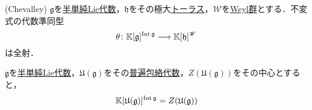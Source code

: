 \documentclass[rep_main]{subfiles}
\begin{document}
\begin{mytheo}[label=thm:Lie-poly-func-ring]{(Chevalley)}
	$\mathfrak{g}$を\hyperref[def:semisimple-LieAlg]{半単純Lie代数}，$\mathfrak{h}$をその極大\hyperref[def:toral-subLieAlg]{トーラス}，$\mathscr{W}$を\hyperref[def:Weylgroup]{Weyl群}とする．不変式の代数準同型
	\begin{equation}
		\theta\colon \mathbb{K}[\mathfrak{g}]^{\operatorname{Int}\mathfrak{g}} \longrightarrow \mathbb{K}[\mathfrak{h}]^\mathscr{W}
	\end{equation}
	は全射．
\end{mytheo}
\begin{mytheo}[label=thm:]{}
	$\mathfrak{g}$を\hyperref[def:semisimple-LieAlg]{半単純Lie代数}，$\mathfrak{U}(\mathfrak{g})$をその\hyperref[def:univ-env-alg]{普遍包絡代数}，$Z(\mathfrak{U}(\mathfrak{g}))$をその中心とすると，
	\begin{equation}
		\mathbb{K}[\mathfrak{U}(\mathfrak{g})]^{\operatorname{Int}\mathfrak{g}} = Z(\mathfrak{U}(\mathfrak{g}))
	\end{equation}
\end{mytheo}
\end{document}
